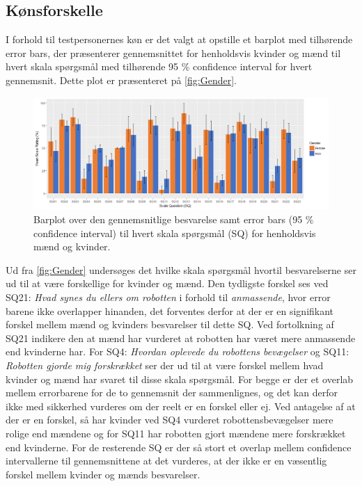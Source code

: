 \subsection{Kønsforskelle}
%
I forhold til testpersonernes køn er det valgt at opstille et barplot med tilhørende error bars, der præsenterer gennemsnittet for henholdsvis kvinder og mænd til hvert skala spørgsmål med tilhørende 95 \% confidence interval for hvert gennemsnit. Dette plot er præsenteret på \autoref{fig:Gender}. 
%
\begin{figure}[H]
\centering
\includegraphics[width = \textwidth]{Figure/DatabehandlingSkalaer/Demografi/GenderBarPlotErrorBars} 
\caption{Barplot over den gennemsnitlige besvarelse samt error bars (95 \% confidence interval) til hvert skala spørgsmål (SQ) for henholdsvis mænd og kvinder.}
\label{fig:Gender}
\end{figure}
\noindent
%
Ud fra \autoref{fig:Gender} undersøges det hvilke skala spørgsmål hvortil besvarelserne ser ud til at være forskellige for kvinder og mænd. Den tydligste forskel ses ved SQ21: \textit{Hvad synes du ellers om robotten} i forhold til \textit{anmassende}, hvor error barene ikke overlapper hinanden, det forventes derfor at der er en signifikant forskel mellem mænd og kvinders besvarelser til dette SQ. Ved fortolkning af SQ21 indikere den at mænd har vurderet at robotten har været mere anmassende end kvinderne har. \blankline
%
For SQ4: \textit{Hvordan oplevede du robottens bevægelser} og SQ11: \textit{Robotten gjorde mig forskrækket} ser der ud til at være forskel mellem hvad kvinder og mænd har svaret til disse skala spørgsmål. For begge er der et overlab mellem errorbarene for de to gennemsnit der sammenlignes, og det kan derfor ikke med sikkerhed vurderes om der reelt er en forskel eller ej. Ved antagelse af at der er en forskel, så har kvinder ved SQ4 vurderet robottensbevægelser mere rolige end mændene og for SQ11 har robotten gjort mændene mere forskrækket end kvinderne.\blankline
%
For de resterende SQ er der så stort et overlap mellem confidence intervallerne til gennemsnittene at det vurderes, at der ikke er en væsentlig forskel mellem kvinder og mænds besvarelser. 